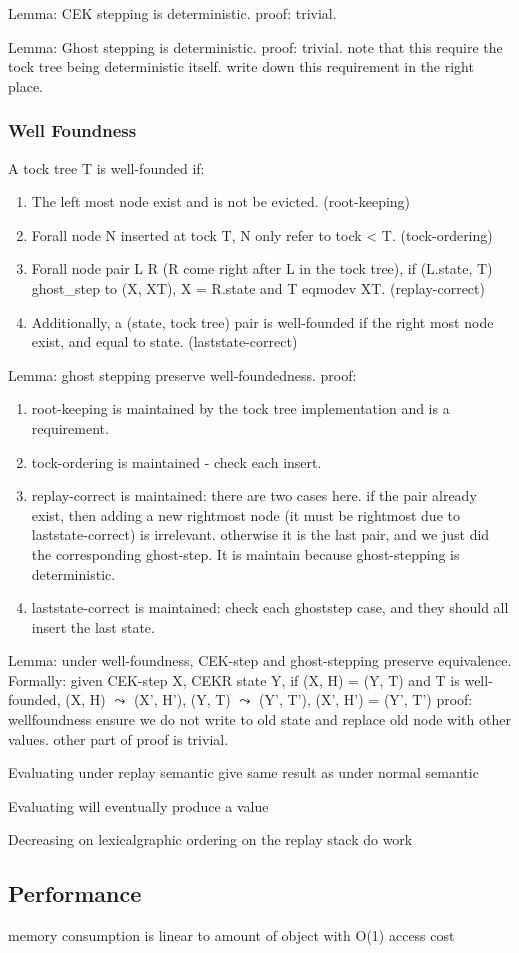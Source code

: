 Lemma: CEK stepping is deterministic.
proof: trivial.

Lemma: Ghost stepping is deterministic.
proof: trivial. note that this require the tock tree being deterministic itself. write down this requirement in the right place.

\subsubsection{Well Foundness}
A tock tree T is well-founded  if:
\begin{enumerate}
	\item The left most node exist and is not be evicted. (root-keeping)
	\item Forall node N inserted at tock T, N only refer to tock < T. (tock-ordering)
	\item Forall node pair L R (R come right after L in the tock tree), if (L.state, T) ghost\_step to (X, XT), X = R.state and T eqmodev XT. (replay-correct)
	\item Additionally, a (state, tock tree) pair is well-founded if the right most node exist, and equal to state. (laststate-correct)
\end{enumerate}

Lemma: ghost stepping preserve well-foundedness.
proof:
\begin{enumerate}
	\item root-keeping is maintained by the tock tree implementation and is a requirement.
	\item tock-ordering is maintained - check each insert.
	\item replay-correct is maintained: there are two cases here. if the pair already exist, then adding a new rightmost node (it must be rightmost due to laststate-correct) is irrelevant. otherwise it is the last pair, and we just did the corresponding ghost-step. It is maintain because ghost-stepping is deterministic.
	\item laststate-correct is maintained: check each ghoststep case, and they should all insert the last state.
\end{enumerate}

Lemma: under well-foundness, CEK-step and ghost-stepping preserve equivalence.
Formally: given CEK-step X, CEKR state Y, if (X, H) = (Y, T) and T is well-founded, (X, H) $\leadsto$ (X', H'), (Y, T) $\leadsto$ (Y', T'), (X', H') = (Y', T')
proof: wellfoundness ensure we do not write to old state and replace old node with other values. other part of proof is trivial.

Evaluating under replay semantic give same result as under normal semantic

Evaluating will eventually produce a value

Decreasing on lexicalgraphic ordering on the replay stack do work

\subsection{Performance}
memory consumption is linear to amount of object with O(1) access cost
